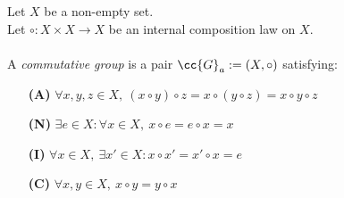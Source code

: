\begin{definition-intro}
    Let \(X\) be a non-empty set.\\
    Let \(\circ: X\times X \to X\) be an internal composition law on \(X\). \\\\
    A \textit{commutative group} is a pair \(\cc{G}_a:= (X, \circ)\) satisfying:
    \begin{enumerate}
        \item [\textbf{(A)}] \(\forall x,y,z\in X,\ (x\circ y)\circ z= x\circ (y\circ z) = x\circ y \circ z\)
        \item [\textbf{(N)}] \(\exists e \in X : \forall x \in X,\ x\circ e = e \circ x = x\)
        \item [\textbf{(I)}] \(\forall x \in X,\ \exists x'\in X: x\circ x' = x'\circ x = e\)
        \item [\textbf{(C)}] \(\forall x,y\in X,\ x\circ y = y\circ x\)
    \end{enumerate}
\end{definition-intro}

\begin{definition-intro}[Semiring]
\end{definition-intro}

\begin{definition-intro}
\end{definition-intro}

\begin{definition-intro}[Ring]
\end{definition-intro}

\begin{definition-intro}[Field]
\end{definition-intro}
\begin{definition-intro}
\end{definition-intro}

\begin{definition-intro}
\end{definition-intro}

\begin{definition-intro}[Unit]
\end{definition-intro}
\begin{definition-intro}
\end{definition-intro}

